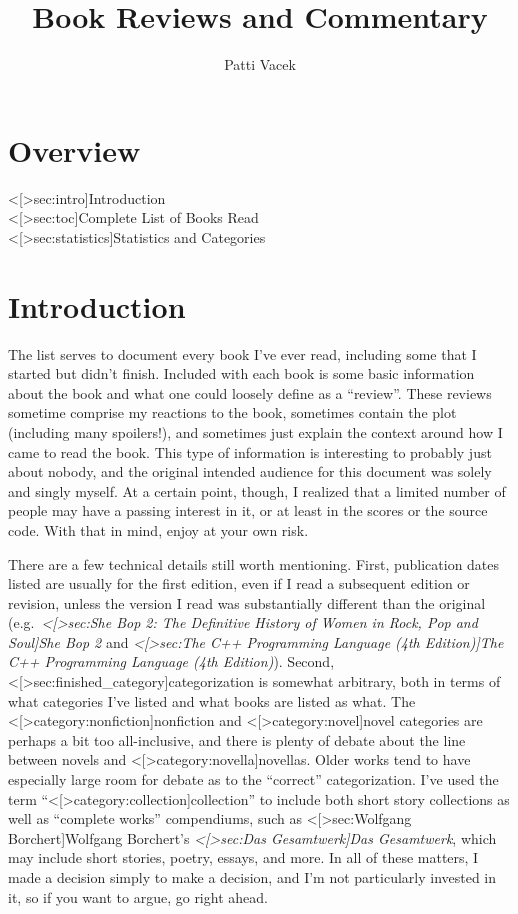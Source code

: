 \documentclass[12pt]{article}
\title{Book Reviews and Commentary}
\author{Patti Vacek}
\def\hyperref#1{<#1>} %
\begin{document}
\maketitle

\section*{Overview}
\hyperref[sec:intro]{Introduction} \dotfill \pageref{sec:intro}
\\\indent\hyperref[sec:toc]{Complete List of Books Read} \dotfill \pageref{sec:toc}
\\\indent\hyperref[sec:statistics]{Statistics and Categories} \dotfill \pageref{sec:statistics}


\section*{Introduction} \label{sec:intro}

The list serves to document every book I've ever read, including some that I started but didn't finish. Included with each book is some basic information about the book and what one could loosely define as a ``review''. These reviews sometime comprise my reactions to the book, sometimes contain the plot (including many spoilers!), and sometimes just explain the context around how I came to read the book. This type of information is interesting to probably just about nobody, and the original intended audience for this document was solely and singly myself. At a certain point, though, I realized that a limited number of people may have a passing interest in it, or at least in the scores or the source code. With that in mind, enjoy at your own risk.

There are a few technical details still worth mentioning. First, publication dates listed are usually for the first edition, even if I read a subsequent edition or revision, unless the version I read was substantially different than the original (e.g.\ \textit{\hyperref[sec:She Bop 2: The Definitive History of Women in Rock, Pop and Soul]{She Bop 2}} and \textit{\hyperref[sec:The C++ Programming Language (4th Edition)]{The C++ Programming Language (4th Edition)}}). Second, \hyperref[sec:finished_category]{categorization} is somewhat arbitrary, both in terms of what categories I've listed and what books are listed as what. The \hyperref[category:nonfiction]{nonfiction} and \hyperref[category:novel]{novel} categories are perhaps a bit too all-inclusive, and there is plenty of debate about the line between novels and \hyperref[category:novella]{novellas}. Older works tend to have especially large room for debate as to the ``correct'' categorization. I've used the term ``\hyperref[category:collection]{collection}'' to include both short story collections as well as ``complete works'' compendiums, such as \hyperref[sec:Wolfgang Borchert]{Wolfgang Borchert}'s \textit{\hyperref[sec:Das Gesamtwerk]{Das Gesamtwerk}}, which may include short stories, poetry, essays, and more. In all of these matters, I made a decision simply to make a decision, and I'm not particularly invested in it, so if you want to argue, go right ahead.
\end{document}
